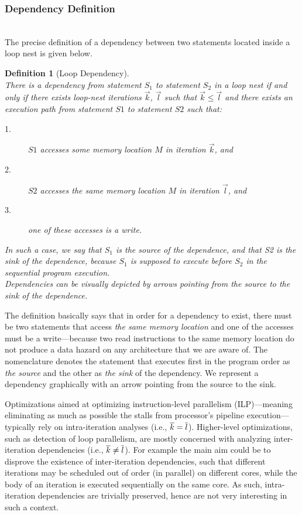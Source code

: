 \documentclass[acmsmall,review]{acmart}\settopmatter{printfolios=true,printccs=false,printacmref=false}
\newtheorem{mydef}{Definition}
\begin{document}
\subsubsection{Dependency Definition}
$\mbox{ }$\\

The precise definition of a dependency between two statements
located inside a loop nest is given below.

\begin{mydef}[Loop Dependency]\label{Loop-Dep}
$\mbox{ }$\\
There is a dependency from statement $S_1$ to statement $S_2$
in a loop nest {\em if and only if} there exists loop-nest
iterations $\vec{k}$, $\vec{l}$ such that $\vec{k} \leq \vec{l}$ 
and there exists an execution path from statement $S1$ to 
statement $S2$ \emph{such that:}
\begin{description}
    \item[1.] $S1$ accesses some memory location $M$ in iteration $\vec{k}$, and
    \item[2.] $S2$ accesses the same memory location $M$ in iteration $\vec{l}$, and
    \item[3.] one of these accesses is a write.
\end{description}
In such a case, we say that $S_1$ is the \emph{source} of the dependence,
and that S2 is the \emph{sink} of the dependence, because $S_1$ is supposed
to execute before $S_2$ in the sequential program execution.\\
Dependencies can be visually depicted by arrows pointing from the source
to the sink of the dependence.
\end{mydef}

The definition basically says that in order for a dependency to exist,
there must be two statements that access \emph{the same memory location} 
and one of the accesses must be a write---because two read instructions
to the same memory location do not produce a data hazard on any 
architecture that we are aware of. The nomenclature denotes the statement 
that executes first in the program order as \emph{the source} and the 
other as \emph{the sink} of the dependency. We represent a dependency 
graphically with an arrow pointing from the source to the sink. 

Optimizations aimed at optimizing instruction-level parallelism 
(ILP)---meaning eliminating as much as possible the stalls from
processor's pipeline execution---typically rely on intra-iteration
analyses (i.e., $\overline{k}=\overline{l}$).   Higher-level optimizations,
such as detection of loop parallelism, are mostly concerned with
analyzing inter-iteration dependencies (i.e., $\overline{k}\neq\overline{l}$).
For example the main aim could be to disprove the existence of inter-iteration
dependencies, such that different iterations may be scheduled 
out of order (in parallel) on different cores, while the body of an 
iteration is executed sequentially on the same core. As such, 
intra-iteration dependencies are trivially preserved, hence are
not very interesting in such a context.
\end{document}
